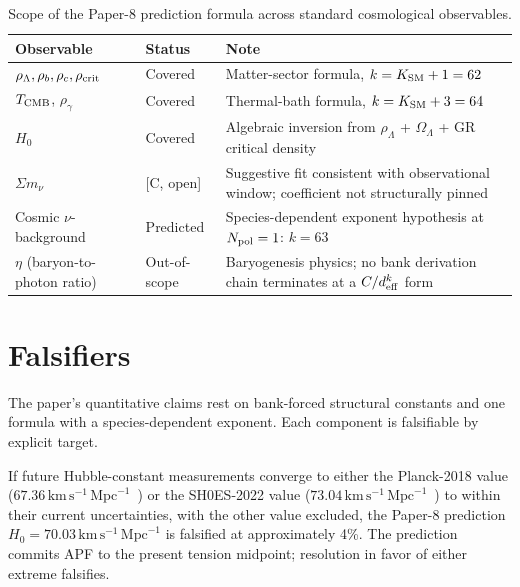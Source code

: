 \documentclass[11pt]{article}
\begin{document}
\begin{table}[h]
\centering
\small
\begin{tabularx}{\textwidth}{@{}l l X@{}}
\toprule
\textbf{Observable} & \textbf{Status} & \textbf{Note} \\
\midrule
$\rho_\Lambda, \rho_b, \rho_c, \rho_{\rm crit}$ & Covered & Matter-sector formula, $k = K_{\rm SM} + 1 = 62$ \\
$T_{\rm CMB}$, $\rho_\gamma$                    & Covered & Thermal-bath formula, $k = K_{\rm SM} + 3 = 64$ \\
$H_0$                                             & Covered & Algebraic inversion from $\rho_\Lambda$ + $\Omega_\Lambda$ + GR critical density \\
$\Sigma m_\nu$                                    & [C, open] & Suggestive fit consistent with observational window; coefficient not structurally pinned \\
Cosmic $\nu$-background                           & Predicted & Species-dependent exponent hypothesis at $N_{\rm pol}=1$: $k = 63$ \\
$\eta$ (baryon-to-photon ratio)                   & Out-of-scope & Baryogenesis physics; no bank derivation chain terminates at a $C/d_{\rm eff}^k$ form \\
\bottomrule
\end{tabularx}
\caption{Scope of the Paper-8 prediction formula across standard cosmological observables.}\label{tab:scope_summary}
\end{table}

\section{Falsifiers}\label{sec:falsifiers}

The paper's quantitative claims rest on bank-forced structural constants and one formula with a species-dependent exponent. Each component is falsifiable by explicit target.

\begin{tcolorbox}[defbox, title={(F1) Hubble-constant convergence}]
If future Hubble-constant measurements converge to either the Planck-2018 value ($67.36\,\mathrm{km}\,\mathrm{s}^{-1}\,\mathrm{Mpc}^{-1}$~\cite{Planck2018}) or the SH0ES-2022 value ($73.04\,\mathrm{km}\,\mathrm{s}^{-1}\,\mathrm{Mpc}^{-1}$~\cite{Riess2022}) to within their current uncertainties, with the other value excluded, the Paper-8 prediction $H_0 = 70.03\,\mathrm{km}\,\mathrm{s}^{-1}\,\mathrm{Mpc}^{-1}$ is falsified at approximately 4\%. The prediction commits APF to the present tension midpoint; resolution in favor of either extreme falsifies.
\end{tcolorbox}
\end{document}
